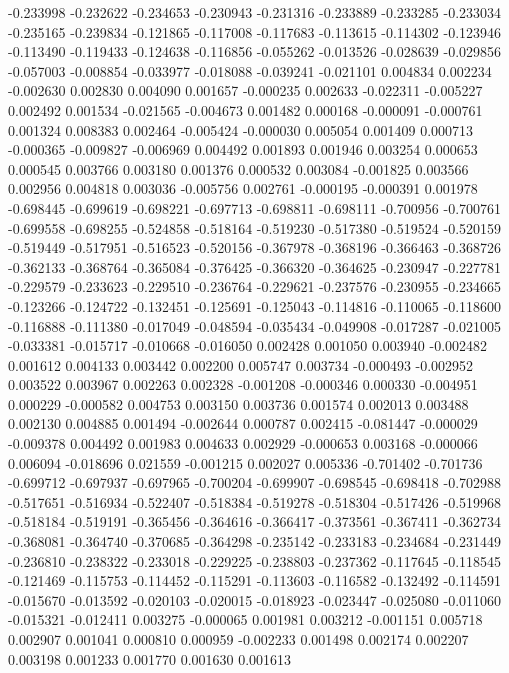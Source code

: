 -0.233998
-0.232622
-0.234653
-0.230943
-0.231316
-0.233889
-0.233285
-0.233034
-0.235165
-0.239834
-0.121865
-0.117008
-0.117683
-0.113615
-0.114302
-0.123946
-0.113490
-0.119433
-0.124638
-0.116856
-0.055262
-0.013526
-0.028639
-0.029856
-0.057003
-0.008854
-0.033977
-0.018088
-0.039241
-0.021101
0.004834
0.002234
-0.002630
0.002830
0.004090
0.001657
-0.000235
0.002633
-0.022311
-0.005227
0.002492
0.001534
-0.021565
-0.004673
0.001482
0.000168
-0.000091
-0.000761
0.001324
0.008383
0.002464
-0.005424
-0.000030
0.005054
0.001409
0.000713
-0.000365
-0.009827
-0.006969
0.004492
0.001893
0.001946
0.003254
0.000653
0.000545
0.003766
0.003180
0.001376
0.000532
0.003084
-0.001825
0.003566
0.002956
0.004818
0.003036
-0.005756
0.002761
-0.000195
-0.000391
0.001978
-0.698445
-0.699619
-0.698221
-0.697713
-0.698811
-0.698111
-0.700956
-0.700761
-0.699558
-0.698255
-0.524858
-0.518164
-0.519230
-0.517380
-0.519524
-0.520159
-0.519449
-0.517951
-0.516523
-0.520156
-0.367978
-0.368196
-0.366463
-0.368726
-0.362133
-0.368764
-0.365084
-0.376425
-0.366320
-0.364625
-0.230947
-0.227781
-0.229579
-0.233623
-0.229510
-0.236764
-0.229621
-0.237576
-0.230955
-0.234665
-0.123266
-0.124722
-0.132451
-0.125691
-0.125043
-0.114816
-0.110065
-0.118600
-0.116888
-0.111380
-0.017049
-0.048594
-0.035434
-0.049908
-0.017287
-0.021005
-0.033381
-0.015717
-0.010668
-0.016050
0.002428
0.001050
0.003940
-0.002482
0.001612
0.004133
0.003442
0.002200
0.005747
0.003734
-0.000493
-0.002952
0.003522
0.003967
0.002263
0.002328
-0.001208
-0.000346
0.000330
-0.004951
0.000229
-0.000582
0.004753
0.003150
0.003736
0.001574
0.002013
0.003488
0.002130
0.004885
0.001494
-0.002644
0.000787
0.002415
-0.081447
-0.000029
-0.009378
0.004492
0.001983
0.004633
0.002929
-0.000653
0.003168
-0.000066
0.006094
-0.018696
0.021559
-0.001215
0.002027
0.005336
-0.701402
-0.701736
-0.699712
-0.697937
-0.697965
-0.700204
-0.699907
-0.698545
-0.698418
-0.702988
-0.517651
-0.516934
-0.522407
-0.518384
-0.519278
-0.518304
-0.517426
-0.519968
-0.518184
-0.519191
-0.365456
-0.364616
-0.366417
-0.373561
-0.367411
-0.362734
-0.368081
-0.364740
-0.370685
-0.364298
-0.235142
-0.233183
-0.234684
-0.231449
-0.236810
-0.238322
-0.233018
-0.229225
-0.238803
-0.237362
-0.117645
-0.118545
-0.121469
-0.115753
-0.114452
-0.115291
-0.113603
-0.116582
-0.132492
-0.114591
-0.015670
-0.013592
-0.020103
-0.020015
-0.018923
-0.023447
-0.025080
-0.011060
-0.015321
-0.012411
0.003275
-0.000065
0.001981
0.003212
-0.001151
0.005718
0.002907
0.001041
0.000810
0.000959
-0.002233
0.001498
0.002174
0.002207
0.003198
0.001233
0.001770
0.001630
0.001613
